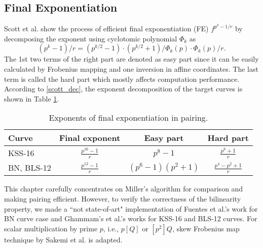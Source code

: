\subsection{Final Exponentiation}
Scott et al. \cite{PAIRING:SBCDK09a} show the process of efficient final exponentiation (FE) $f^{p^k-1/r}$ by decomposing the exponent using cyclotomic polynomial $\Phi_{k}$ as 
\begin{equation}\label{scott_dec}
(p^k-1)/r = (p^{k/2}-1) \cdot(p^{k/2}+1)/\Phi_{k}(p)\cdot \Phi_{k}(p)/r.
\end{equation}
The 1st two terms of the right part are denoted as easy part since it can be easily calculated by Frobenius mapping and one inversion in affine coordinates. 
The last term is called the hard part which mostly affects computation performance.
According to \eqref{scott_dec}, the exponent decomposition of the target curves is shown in Table \ref{fe_decomp}.
\renewcommand{\baselinestretch}{1.5}
\begin{table}[htb]
	\centering
	\caption{Exponents of final exponentiation in pairing.}
	\label{fe_decomp}
	\begin{tabular}{l|c|c|c}
		\hline
		Curve      & \quad Final exponent                \quad  & \quad Easy part    \quad                   &   \quad Hard part     \quad                                        \\ \hline
		KSS-16     & \quad $\frac{p^{16}-1}{r}$ \quad & \quad $p^8-1$                           \quad     & \quad $\frac{p^8+1}{r}$      \quad                                         \\ \hline
		BN, BLS-12 \quad \quad &  \quad $\frac{p^{12}-1}{r}$ \quad & \quad $(p^6-1)(p^2+1)$ \quad & \quad $\frac{p^4-p^2+1}{r}$  \quad\\
		\hline
	\end{tabular}
\end{table}
\renewcommand{\baselinestretch}{1.0}

This chapter carefully concentrates on Miller's algorithm for comparison and making pairing efficient. However, to verify the correctness of the bilinearity property,  we made a ``not state-of-art" implementation of  Fuentes et al.'s work \cite{SAC:FueKnaRod11} for  BN curve case and  Ghammam's et al.'s works \cite{EPRINT:GhaFou16b,EPRINT:GhaFou16a} for KSS-16 and BLS-12 curves.
For scalar multiplication by prime $p$, i.e., $p[Q]$ or $[p^2]Q$, skew Frobenius map technique by Sakemi et al. \cite{CANS:SNOKM08} is adapted.



